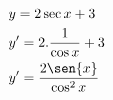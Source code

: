 \begin{ex}
\begin{align}
&y=2\sec{x}+3\nonumber\\
&y'=2.\frac{1}{\cos{x}}+3\nonumber\\
&y'=\frac{2\sen{x}}{\cos^2{x}}\nonumber
\end{align}
\end{ex}
